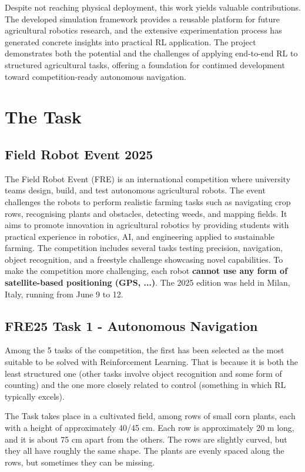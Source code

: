 \documentclass[11pt,a4paper,twocolumn]{article}
\begin{document}
Despite not reaching physical deployment, this work yields valuable contributions. The developed simulation framework provides a reusable platform for future agricultural robotics research, and the extensive experimentation process has generated concrete insights into practical RL application. The project demonstrates both the potential and the challenges of applying end-to-end RL to structured agricultural tasks, offering a foundation for continued development toward competition-ready autonomous navigation.


\section{The Task}
\label{sec:task}

\subsection{Field Robot Event 2025}
The Field Robot Event (FRE) is an international competition where university teams design, build, and test autonomous agricultural robots. The event challenges the robots to perform realistic farming tasks such as navigating crop rows, recognising plants and obstacles, detecting weeds, and mapping fields. It aims to promote innovation in agricultural robotics by providing students with practical experience in robotics, AI, and engineering applied to sustainable farming. The competition includes several tasks testing precision, navigation, object recognition, and a freestyle challenge showcasing novel capabilities.
To make the competition more challenging, each robot \textbf{cannot use any form of satellite-based positioning (GPS, ...)}.
The 2025 edition was held in Milan, Italy, running from June 9 to 12.

\subsection{FRE25 Task 1 - Autonomous Navigation}
\label{subsec:task1}
Among the 5 tasks of the competition, the first has been selected as the most suitable to be solved with Reinforcement Learning. That is because it is both the least structured one (other tasks involve object recognition and some form of counting) and the one more closely related to control (something in which RL typically excels).

The Task takes place in a cultivated field, among rows of small corn plants, each with a height of approximately 40/45 cm. Each row is approximately 20 m long, and it is about 75 cm apart from the others. The rows are slightly curved, but they all have roughly the same shape. The plants are evenly spaced along the rows, but sometimes they can be missing.
\end{document}
